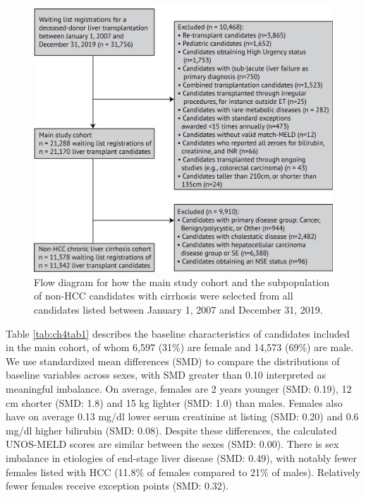 \documentclass[11pt,twoside,]{book}
\begin{document}
\begin{figure}[ht]

{\centering \includegraphics[width=0.95\linewidth]{figures/ch4/fig2_flow_diagram} 

}

\caption{Flow diagram for how the main study cohort and the subpopulation of non-HCC candidates with cirrhosis were selected from all candidates listed between January 1, 2007 and December 31, 2019.}\label{fig:ch4fig2}
\end{figure}

\FloatBarrier

Table \ref{tab:ch4tab1} describes the baseline characteristics of candidates included in the
main cohort, of whom 6,597 (31\%) are female and 14,573 (69\%) are male. We
use standardized mean differences (SMD) to compare the distributions of baseline
variables across sexes, with SMD greater than 0.10 interpreted as meaningful imbalance.
On average, females are 2 years younger (SMD: 0.19),
12 cm shorter (SMD: 1.8) and 15 kg lighter (SMD: 1.0) than males. Females also
have on average 0.13 mg/dl lower serum creatinine at listing (SMD: 0.20) and
0.6 mg/dl higher bilirubin (SMD: 0.08). Despite these
differences, the calculated UNOS-MELD scores are similar
between the sexes (SMD: 0.00).
There is sex imbalance in etiologies of end-stage liver disease (SMD: 0.49), with
notably fewer females listed with HCC (11.8\% of females compared to 21\% of males). Relatively fewer females receive
exception points (SMD: 0.32).
\end{document}
